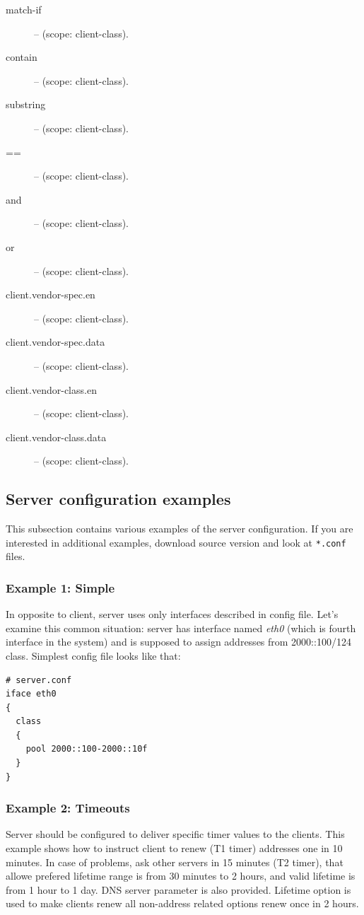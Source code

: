 \begin{description}
\item[match-if] -- (scope: client-class).
\item[contain] -- (scope: client-class).
\item[substring] -- (scope: client-class).
\item[==] -- (scope: client-class).
\item[and] -- (scope: client-class).
\item[or] -- (scope: client-class).
\item[client.vendor-spec.en] -- (scope: client-class).
\item[client.vendor-spec.data] -- (scope: client-class).
\item[client.vendor-class.en] -- (scope: client-class).
\item[client.vendor-class.data] -- (scope: client-class).
\end{description}


\subsection{Server configuration examples}

This subsection contains various examples of the server
configuration. If you are interested in additional examples, download
source version and look at \verb+*.conf+ files.

\subsubsection{Example 1: Simple}

In opposite to client, server uses only interfaces described in config
file. Let's examine this common situation: server has interface named
\emph{eth0} (which is fourth interface in the system) and is supposed
to assign addresses from 2000::100/124 class. Simplest config file
looks like that:

\begin{lstlisting}
# server.conf
iface eth0
{
  class
  {
    pool 2000::100-2000::10f
  }
}
\end{lstlisting}

\subsubsection{Example 2: Timeouts}
Server should be configured to deliver specific timer values to the
clients. This example shows how to instruct client to renew (T1 timer)
addresses one in 10 minutes. In case of problems, ask other servers in
15 minutes (T2 timer), that allowe prefered lifetime range is from 30
minutes to 2 hours, and valid lifetime is from 1 hour to 1 day. DNS
server parameter is also provided. Lifetime option is used to make
clients renew all non-address related options renew once in 2 hours.

